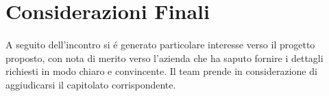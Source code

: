 \section{Considerazioni Finali}

\paragraph{}
A seguito dell'incontro si é generato particolare interesse verso il progetto
proposto, con nota di merito verso l'azienda che ha saputo fornire i dettagli richiesti
in modo chiaro e convincente.
\newline
Il team prende in considerazione di aggiudicarsi il capitolato corrispondente.
